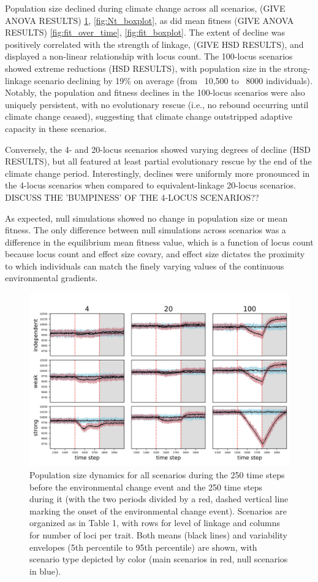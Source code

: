 \documentclass[9pt,twocolumn,twoside,lineno]{pnas-new}
\begin{document}
Population size declined during climate change across all scenarios, (GIVE ANOVA 
RESULTS) \ref{fig:Nt_over_time}, \ref{fig:Nt_boxplot}, as did mean fitness (GIVE ANOVA 
RESULTS) \ref{fig:fit_over_time}, \ref{fig:fit_boxplot}. The extent of decline was 
positively correlated with the strength of linkage, (GIVE HSD RESULTS), and 
displayed a non-linear relationship with locus count. The 100-locus scenarios showed 
extreme reductions (HSD RESULTS), with population size in the strong-linkage scenario
declining by 19\% on average (from ~10,500 to ~8000 individuals).
Notably, the population and fitness declines in the 100-locus scenarios
were also uniquely persistent, with no evolutionary rescue (i.e., no rebound occurring until climate change ceased), 
suggesting that climate change outstripped adaptive capacity in these scenarios.

Conversely, the 4- and 20-locus scenarios showed varying degrees
of decline (HSD RESULTS),
but all featured at least partial evolutionary rescue by the end of the climate change period.
Interestingly, declines were uniformly more pronounced in the 4-locus scenarios
when compared to equivalent-linkage 20-locus scenarios. DISCUSS THE 'BUMPINESS' OF THE 4-LOCUS SCENARIOS?? 
 
As expected, null simulations showed no change in population size or mean fitness. The only difference between null simulations across scenarios was a difference in the 
equilibrium mean fitness value, which is a function of locus count because locus count 
and effect size covary, and effect size dictates the proximity to which individuals can 
match the finely varying values of the continuous environmental gradients.

\begin{figure}
\centering
\includegraphics[width=11.4cm]{Nt_over_time.jpg}
\caption{Population size dynamics for all scenarios during the 250 time steps before the environmental change event and the 250 time steps during it (with the two periods divided by a red, dashed vertical line marking the onset of the environmental change event). Scenarios are organized as in Table 1, with rows for level of linkage and columns for number of loci per trait. Both means (black lines) and variability envelopes (5th percentile to 95th percentile) are shown, with scenario type depicted by color (main scenarios in red, null scenarios in blue).}
\label{fig:Nt_over_time}
\end{figure}
\end{document}
